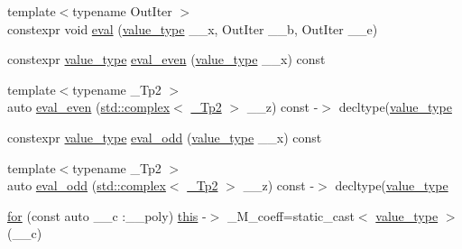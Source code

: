 \begin{DoxyCompactItemize}
{\footnotesize template$<$typename Out\+Iter $>$ }\\constexpr void \hyperlink{class____gnu__cxx_1_1__StaticPolynomial_a9519bb75237b79319607bbcce2ff92f8}{eval} (\hyperlink{class____gnu__cxx_1_1__StaticPolynomial_af23110f5a002cd6caa3542df7cf35284}{value\+\_\+type} \+\_\+\+\_\+x, Out\+Iter \+\_\+\+\_\+b, Out\+Iter \+\_\+\+\_\+e)
\item 
constexpr \hyperlink{class____gnu__cxx_1_1__StaticPolynomial_af23110f5a002cd6caa3542df7cf35284}{value\+\_\+type} \hyperlink{class____gnu__cxx_1_1__StaticPolynomial_aa52266d4ffacd2427da8c94540109ec1}{eval\+\_\+even} (\hyperlink{class____gnu__cxx_1_1__StaticPolynomial_af23110f5a002cd6caa3542df7cf35284}{value\+\_\+type} \+\_\+\+\_\+x) const
\item 
{\footnotesize template$<$typename \+\_\+\+Tp2 $>$ }\\auto \hyperlink{class____gnu__cxx_1_1__StaticPolynomial_a2d017d79d9e93654de68c3a556c3c730}{eval\+\_\+even} (\hyperlink{classstd_1_1complex}{std\+::complex}$<$ \hyperlink{class____gnu__cxx_1_1__StaticPolynomial_a111ee5aedd5ae8c0b4d8fa8f29d1f9b9}{\+\_\+\+Tp2} $>$ \+\_\+\+\_\+z) const -\/$>$ decltype(\hyperlink{class____gnu__cxx_1_1__StaticPolynomial_af23110f5a002cd6caa3542df7cf35284}{value\+\_\+type}
\item 
constexpr \hyperlink{class____gnu__cxx_1_1__StaticPolynomial_af23110f5a002cd6caa3542df7cf35284}{value\+\_\+type} \hyperlink{class____gnu__cxx_1_1__StaticPolynomial_ab8249741ad67288e9fc8d256df3e3e90}{eval\+\_\+odd} (\hyperlink{class____gnu__cxx_1_1__StaticPolynomial_af23110f5a002cd6caa3542df7cf35284}{value\+\_\+type} \+\_\+\+\_\+x) const
\item 
{\footnotesize template$<$typename \+\_\+\+Tp2 $>$ }\\auto \hyperlink{class____gnu__cxx_1_1__StaticPolynomial_a4412225874bf2af0943abe9340024278}{eval\+\_\+odd} (\hyperlink{classstd_1_1complex}{std\+::complex}$<$ \hyperlink{class____gnu__cxx_1_1__StaticPolynomial_a111ee5aedd5ae8c0b4d8fa8f29d1f9b9}{\+\_\+\+Tp2} $>$ \+\_\+\+\_\+z) const -\/$>$ decltype(\hyperlink{class____gnu__cxx_1_1__StaticPolynomial_af23110f5a002cd6caa3542df7cf35284}{value\+\_\+type}
\item 
\hyperlink{class____gnu__cxx_1_1__StaticPolynomial_a93fc2113c7886a70c56ef43161e83421}{for} (const auto \+\_\+\+\_\+c \+:\+\_\+\+\_\+poly) \hyperlink{class____gnu__cxx_1_1__StaticPolynomial_a4de3c06513ac6f8677fe098213a89fff}{this} -\/$>$ \+\_\+\+M\+\_\+coeff=static\+\_\+cast$<$ \hyperlink{class____gnu__cxx_1_1__StaticPolynomial_af23110f5a002cd6caa3542df7cf35284}{value\+\_\+type} $>$(\+\_\+\+\_\+c)

\end{DoxyCompactItemize}
